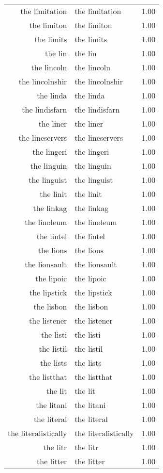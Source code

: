 \begin{table}[ht]
\begin{tabular}{rlr}
  the limitation & the limitation & 1.00 \\ 
  the limiton & the limiton & 1.00 \\ 
  the limits & the limits & 1.00 \\ 
  the lin & the lin & 1.00 \\ 
  the lincoln & the lincoln & 1.00 \\ 
  the lincolnshir & the lincolnshir & 1.00 \\ 
  the linda & the linda & 1.00 \\ 
  the lindisfarn & the lindisfarn & 1.00 \\ 
  the liner & the liner & 1.00 \\ 
  the lineservers & the lineservers & 1.00 \\ 
  the lingeri & the lingeri & 1.00 \\ 
  the linguin & the linguin & 1.00 \\ 
  the linguist & the linguist & 1.00 \\ 
  the linit & the linit & 1.00 \\ 
  the linkag & the linkag & 1.00 \\ 
  the linoleum & the linoleum & 1.00 \\ 
  the lintel & the lintel & 1.00 \\ 
  the lions & the lions & 1.00 \\ 
  the lionsault & the lionsault & 1.00 \\ 
  the lipoic & the lipoic & 1.00 \\ 
  the lipstick & the lipstick & 1.00 \\ 
  the lisbon & the lisbon & 1.00 \\ 
  the listener & the listener & 1.00 \\ 
  the listi & the listi & 1.00 \\ 
  the listil & the listil & 1.00 \\ 
  the lists & the lists & 1.00 \\ 
  the listthat & the listthat & 1.00 \\ 
  the lit & the lit & 1.00 \\ 
  the litani & the litani & 1.00 \\ 
  the literal & the literal & 1.00 \\ 
  the literalistically & the literalistically & 1.00 \\ 
  the litr & the litr & 1.00 \\ 
  the litter & the litter & 1.00 \\ 

\end{tabular}
\end{table}
